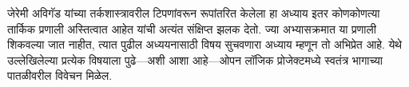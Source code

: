 \documentclass[../../../include/open-logic-chapter]{subfiles}
\begin{document}

\begin{editorial}
  जेरेमी अविगॅड यांच्या तर्कशास्त्रावरील टिपणांवरून रूपांतरित केलेला हा
  अध्याय इतर कोणकोणत्या तार्किक प्रणाली अस्तित्वात आहेत यांची अत्यंत संक्षिप्त
  झलक देतो. ज्या अभ्यासक्रमात या प्रणाली शिकवल्या जात नाहीत, त्यात पुढील
  अध्ययनासाठी विषय सुचवणारा अध्याय म्हणून तो अभिप्रेत आहे. येथे उल्लेखिलेल्या
  प्रत्येक विषयाला पुढे---अशी आशा आहे---ओपन लॉजिक प्रोजेक्टमध्ये स्वतंत्र
  भागाच्या पातळीवरील विवेचन मिळेल.
\end{editorial}








\OLEndChapterHook
\end{document}
